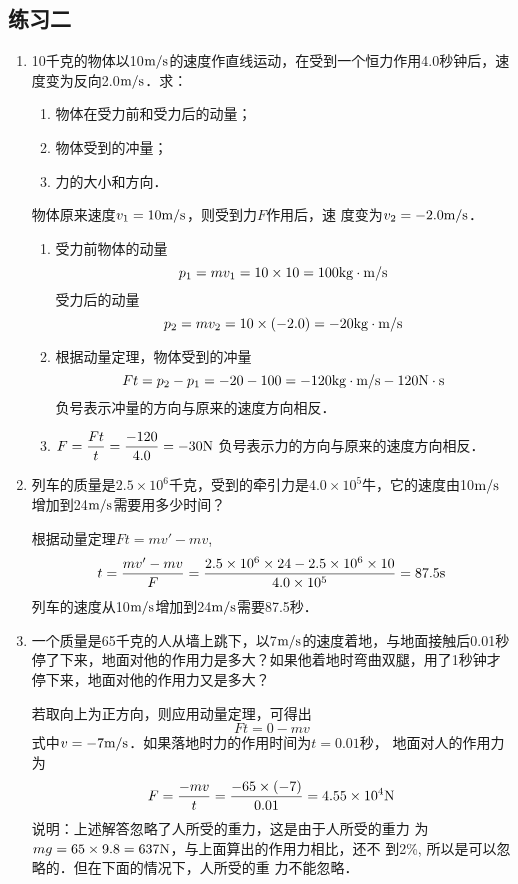 \subsection{练习二}
\begin{enumerate}
    \item 10千克的物体以10$\text{m}/\text{s}$的速度作直线运动，在受到一个恒力作用4.0秒钟后，速度变为反向2.0$\text{m}/\text{s}$．求：
     \begin{enumerate}
        \item 物体在受力前和受力后的动量；
        \item 物体受到的冲量；
        \item 力的大小和方向．
    \end{enumerate}

    \begin{solution}
物体原来速度$v_1=10\text{m}/\text{s}$，则受到力$F$作用后，速
度变为$v_2=-2.0\text{m}/\text{s}$．
\begin{enumerate}
\item 受力前物体的动量
\[p_1=mv_1=10\times10=100{\rm kg\cdot m/s}\]
受力后的动量
\[p_2=mv_2=10\times(-2.0)=-20{\rm kg\cdot m/s}\]
\item 根据动量定理，物体受到的冲量
\[Ft=p_2-p_1=-20-100=-120{\rm kg\cdot m/s}-120{\rm N\cdot s}\]
负号表示冲量的方向与原来的速度方向相反．
\item $F=\dfrac{Ft}{t}=\dfrac{-120}{4.0}=-30{\rm N}$
负号表示力的方向与原来的速度方向相反．
\end{enumerate}

    
    \end{solution}
    \item 列车的质量是$2.5\times 10^6$千克，受到的牵引力是$4.0\times 
    10^5$牛，它的速度由10$\text{m}/\text{s}$增加到24$\text{m}/\text{s}$需要用多少时间？

    \begin{solution}
        根据动量定理$Ft=mv'-mv$,
\[t=\frac{mv'-mv}{F}=\frac{ 2.5\times10^6\times24-2.5\times10^6\times10}{4.0\times 10^5}= 87.5{\rm s}\]      
列车的速度从10$\text{m}/\text{s}$增加到24$\text{m}/\text{s}$需要87.5秒．
    \end{solution}
    \item 一个质量是65千克的人从墙上跳下，以7$\text{m}/\text{s}$的速度着地，与地面接触后0.01秒停了下来，地面对他的作用力是多大？如果他着地时弯曲双腿，用了1秒钟才停下来，地面对他的作用力又是多大？

    \begin{solution}
若取向上为正方向，则应用动量定理，可得出
\[Ft=0-mv\]
式中$v=-7\text{m}/\text{s}$．如果落地时力的作用时间为$t=0.01$秒，
地面对人的作用力为
\[F=\frac{-mv}{t}=\frac{-65\times (-7)}{0.01}=4.55\times 10^4{\rm N}\]
说明：上述解答忽略了人所受的重力，这是由于人所受的重力
为$mg=65\times9.8=637{\rm N}$，与上面算出的作用力相比，还不
到2\%, 所以是可以忽略的．但在下面的情况下，人所受的重
力不能忽略．


\end{solution}
\end{enumerate}
